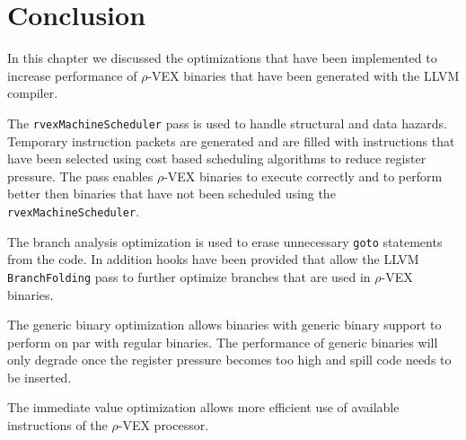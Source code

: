 


\section{Conclusion}
In this chapter we discussed the optimizations that have been implemented to increase performance of $\rho$-VEX binaries that have been generated with the LLVM compiler.

The \texttt{rvexMachineScheduler} pass is used to handle structural and data hazards. Temporary instruction packets are generated and are filled with instructions that have been selected using cost based scheduling algorithms to reduce register pressure. The pass enables $\rho$-VEX binaries to execute correctly and to perform better then binaries that have not been scheduled using the \texttt{rvexMachineScheduler}.

The branch analysis optimization is used to erase unnecessary \texttt{goto} statements from the code. In addition hooks have been provided that allow the LLVM \texttt{BranchFolding} pass to further optimize branches that are used in $\rho$-VEX binaries.

The generic binary optimization allows binaries with generic binary support to perform on par with regular binaries. The performance of generic binaries will only degrade once the register pressure becomes too high and spill code needs to be inserted.

The immediate value optimization allows more efficient use of available instructions of the  $\rho$-VEX processor.
\acresetall

